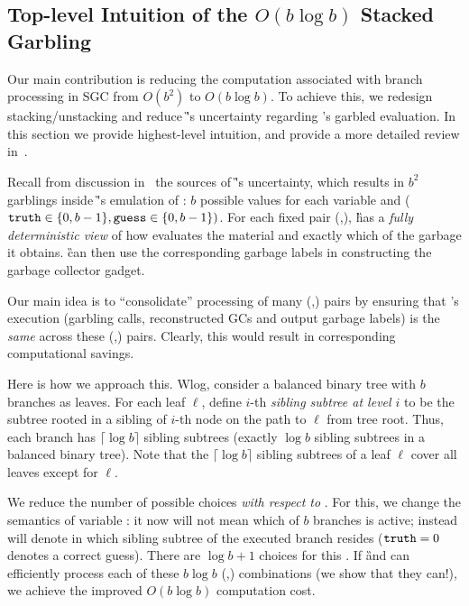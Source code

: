 
\subsection{Top-level Intuition of the $O(b \log b)$ Stacked Garbling}
\label{sec:intuition}

Our main contribution is reducing the computation associated with branch processing in SGC from $O(b^2)$ to $O(b \log b)$.
To achieve this, we redesign stacking/unstacking and reduce \G's uncertainty regarding \E's garbled evaluation.  
In this section we provide highest-level intuition, and provide a more detailed review in~.
 
   Recall from discussion in~ the  sources of \G's uncertainty, which results in $b^2$ garblings inside \G's emulation of \E: $b$ possible values for each variable \truth and \guess ($\mathtt{truth} \in\{0,b-1\}, \mathtt{guess}\in\{0,b-1\})$.
   For each fixed pair  (\truth,\guess), \G has a {\em fully deterministic view} of how \E evaluates the material and exactly which of the garbage it obtains.  \G can then use the corresponding garbage labels in constructing the garbage collector gadget.
   
   Our main idea  is to ``consolidate''  processing of many (\truth,\guess) pairs by ensuring that \E's execution (garbling calls, reconstructed GCs and output garbage labels) is the {\em same} across these (\truth,\guess) pairs.  Clearly, this would result in corresponding computational savings. 
   

  
  Here is how we approach this.  Wlog, consider a balanced binary tree with $b$ branches as leaves. 
  For each leaf $\ell$, define $i$-th {\em sibling subtree at level $i$} to be the subtree rooted in a sibling of $i$-th node on the path to $\ell$ from tree root.  Thus, each branch has $\lceil \log b \rceil$ sibling subtrees (exactly $\log b$ sibling subtrees in a balanced binary tree).
  Note that the $\lceil \log b \rceil$ sibling subtrees of a leaf $\ell$ 
  cover all leaves except for $\ell$.
  
    
 We reduce the number of possible \truth choices  {\em with respect to  \guess}.  For this, we  change the semantics of variable \truth: it now will not mean which of $b$ branches is active; instead \truth will denote in which sibling subtree of \guess the executed branch resides ($\mathtt{truth}=0$ denotes a correct guess).  There are $\log b + 1$ choices for this \truth.  If \G and \E can efficiently process each of these $b\log b$  (\truth,\guess) combinations  (we show that they can!), we achieve the improved $O(b\log b)$ computation cost.
  
  
  
 

